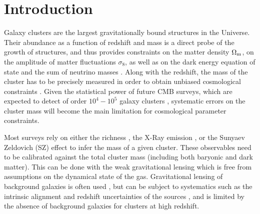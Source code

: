 \documentclass[prd, superscriptaddress, tightenlines, longbibliography, nofootinbib, eqsecnum, amsfonts, amsmath, floatfix, twocolumn, notitlepage]{revtex4-2}
\newcommand{\JC}[1]{\color{purple}{{JC:#1}}\color{black}\xspace}
\begin{document}

   \maketitle

\tableofcontents
\section{Introduction}
\setcounter{footnote}{0}

Galaxy clusters are the largest gravitationally bound structures in the Universe. Their abundance as a function of redshift and mass is a direct probe of the growth of structures, and thus provides constraints on the matter density $\Omega_{\rm m}$, on the amplitude of matter fluctuations $\sigma_8$, as well as on the dark energy equation of state and the sum of neutrino masses \cite{Vikhlinin:2008ym,Sehgal:2010ca,Allen:2011zs,Planck:2013lkt, Mantz:2014xba,Mantz:2014paa, Planck:2015lwi,SPT:2016izt, SPT:2018njh}. Along with the redshift, the mass of the cluster has to be precisely measured in order to obtain unbiased cosmological constraints \cite{Pratt:2019cnf, Salvati:2020exw, Salvati:2021gkt}. Given the statistical power of future CMB surveys, which are expected to detect of order $10^4 - 10^5$ galaxy clusters \cite{Madhavacheril:2017onh, SimonsObservatory:2018koc, CMB-S4:2016ple}, systematic errors on the cluster mass will become the main limitation\JC{what about now?} for cosmological parameter constraints. 

Most surveys rely on either the richness \cite[e.g.][]{Koester:2007bj,DES:2015mqu,Andreon:2016eck, Farahi:2016xux,Simet:2016mzg}, the X-Ray emission \cite[e.g.][]{Arnaud:2005ur, Arnaud:2007br, Vikhlinin:2008ym}, or the Sunyaev Zeldovich (SZ) effect \cite[e.g.][]{Vanderlinde:2010eb, Planck:2013lkt,Planck:2015lwi} to infer the mass of a given cluster. These observables need to be calibrated against the total cluster mass (including both baryonic and dark matter). This can be done with the weak gravitational lensing which is free from assumptions on the dynamical state of the gas.
Gravitational lensing of background galaxies is often used \cite{vonderLinden:2014haa, Hoekstra:2015gda, Smith:2015qhs, Sereno:2017zcn, Penna-Lima:2016tvo, Bellagamba:2018gec,Miyatake:2018lpb, Umetsu:2020wlf}, but can be subject to systematics such as the intrinsic alignment and  redshift uncertainties of the sources \cite{Becker:2010xj}, and is limited by the absence of background galaxies for clusters at high redshift. 
\end{document}
